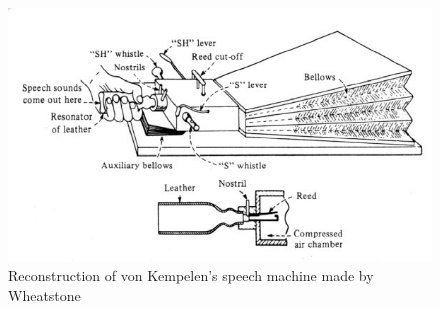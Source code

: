 \begin{figure}[htb]
	\begin{center}
		\includegraphics[width=\textwidth]{images/von_kempelen_machine.jpg}
		\caption{Reconstruction of von Kempelen's speech machine made by Wheatstone \cite{flanagan_book}}
		\label{fig:speech_machine}
	\end{center}
\end{figure}